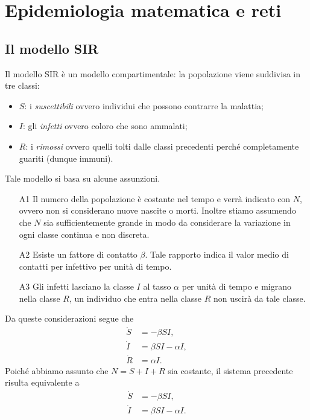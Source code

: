 \chapter{Epidemiologia matematica e reti}
\section{Il modello SIR}{\label{modellosir}}
Il modello SIR \`e un modello compartimentale: la popolazione  viene suddivisa in tre classi: \begin{itemize}
	\item $S$: i \textit{suscettibili}  ovvero individui che possono contrarre la malattia;
	\item $I$: gli \textit{infetti} ovvero coloro che sono ammalati;
	\item $R$: i \textit{rimossi} ovvero  quelli tolti dalle classi precedenti perch\'e completamente guariti (dunque immuni).
	\end{itemize}
	Tale modello si basa su alcune assunzioni.
	\begin{itemize}
		\item[A1] Il numero della popolazione \`e costante nel tempo e verr\`a indicato con $N$, ovvero non si considerano nuove nascite o morti. Inoltre stiamo assumendo che $N$ sia sufficientemente grande in modo da considerare la variazione in ogni classe continua e non discreta.
\item[A2] Esiste un fattore di contatto  $\beta$. Tale rapporto indica il valor medio di contatti per infettivo per unit\`a di tempo.
		\item[A3] Gli infetti lasciano la classe $I$ al tasso $\alpha$ per unit\`a di tempo e migrano nella classe $R$, un individuo che entra nella classe $R$ non uscir\`a da tale classe.
	\end{itemize}
Da queste considerazioni segue che 
\begin{equation} 
\label{SIR}
\begin{aligned}
  \dot{S}&=-\beta S I,\\
  \dot I &= \beta S I -\alpha I,\\
  \dot R&=\alpha I.
\end{aligned}
\end{equation}
Poich\'e abbiamo assunto che $N=S+I+R$ sia costante, il sistema precedente risulta equivalente a 
\begin{equation}
\label{SI}
\begin{aligned}
  \dot S&=-\beta S I,\\
  \dot I&= \beta S I -\alpha I.
\end{aligned}
\end{equation}\\ 

